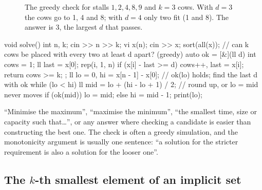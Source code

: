 \begin{figure}[htbp]
\centering
{}
\caption{The greedy check for stalls $1, 2, 4, 8, 9$ and $k = 3$ cows. With $d = 3$ the cows go to 1, 4 and 8; with
$d = 4$ only two fit (1 and 8). The answer is 3, the largest $d$ that passes.}
\label{fig:cows}
\end{figure}

\begin{code}
void solve() {
    int n, k;
    cin >> n >> k;
    vi x(n);
    cin >> x;
    sort(all(x));
    // can k cows be placed with every two at least d apart? (greedy)
    auto ok = [&](ll d) {
        int cows = 1;
        ll last = x[0];
        rep(i, 1, n) if (x[i] - last >= d) cows++, last = x[i];
        return cows >= k;
    };
    ll lo = 0, hi = x[n - 1] - x[0];  // ok(lo) holds; find the last d with ok
    while (lo < hi) {
        ll mid = lo + (hi - lo + 1) / 2;  // round up, or lo = mid never moves
        if (ok(mid)) lo = mid;
        else hi = mid - 1;
    }
    print(lo);
}
\end{code}

\begin{recognize}
``Minimise the maximum'', ``maximise the minimum'', ``the smallest time, size or capacity such that\ldots'', or any answer
where checking a candidate is easier than constructing the best one. The check is often a greedy simulation, and the
monotonicity argument is usually one sentence: ``a solution for the stricter requirement is also a solution for the looser
one''.
\end{recognize}

\subsection{The $k$-th smallest element of an implicit set}

